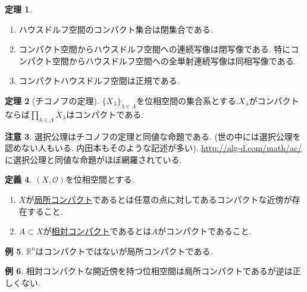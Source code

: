 \documentclass[dvipdfmx,a4paper,11pt]{article}
\newcommand{\R}{\mathbb{R}}
\theoremstyle{definition}
\newtheorem{thm}{定理}
\newtheorem{dfn}[thm]{定義}
\newtheorem{rem}[thm]{注意}
\newtheorem{exa}[thm]{例}
\begin{document}
   \begin{tcolorbox}[
    colback = white,
    colframe = green!35!black,
    fonttitle = \bfseries,
    breakable = true]
    \begin{thm}
    \text{}
    \begin{enumerate}
     \setlength{\parskip}{0cm} 
  \setlength{\itemsep}{0cm} 
    \item ハウスドルフ空間のコンパクト集合は閉集合である.
    \item コンパクト空間からハウスドルフ空間への連続写像は閉写像である. 特にコンパクト空間からハウスドルフ空間への全単射連続写像は同相写像である.
    \item コンパクトハウスドルフ空間は正規である.
    \end{enumerate}
  \end{thm}
   \end{tcolorbox}

     \begin{tcolorbox}[
    colback = white,
    colframe = green!35!black,
    fonttitle = \bfseries,
    breakable = true]
    \begin{thm}[チコノフの定理]
    $\{X_{\lambda}\}_{\lambda \in \Lambda}$を位相空間の集合系とする.$X_{\lambda}$がコンパクトならば$\prod_{\lambda \in \Lambda}X_{\lambda}$はコンパクトである.
  \end{thm}
   \end{tcolorbox}
 \begin{rem}
 選択公理はチコノフの定理と同値な命題である. (世の中には選択公理を認めない人もいる. 内田本もそのような記述が多い).
 \url{http://alg-d.com/math/ac/}に選択公理と同値な命題がほぼ網羅されている.
 \end{rem}

  \begin{tcolorbox}[
    colback = white,
    colframe = green!35!black,
    fonttitle = \bfseries,
    breakable = true]
    \begin{dfn}
    $(X, \mathscr{O})$を位相空間とする.
    \begin{enumerate}
    \item $X$が\underline{局所コンパクト}であるとは任意の点に対してあるコンパクトな近傍が存在すること.
    \item $A \subset X$が\underline{相対コンパクト}であるとは$\overline{A}$がコンパクトであること.
    \end{enumerate}
  \end{dfn}
    \end{tcolorbox}
 \begin{exa}
 $\R^n$はコンパクトではないが局所コンパクトである. 
 \end{exa}
  \begin{exa}
相対コンパクトな開近傍を持つ位相空間は局所コンパクトであるが逆は正しくない.
 \end{exa}
\end{document}
